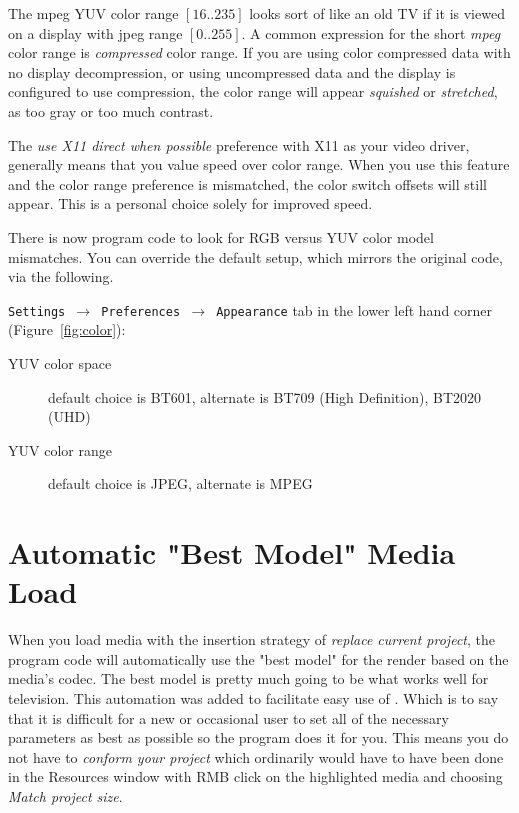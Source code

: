 The mpeg YUV color range $[16..235]$ looks sort of like an old TV if it is viewed on a display with jpeg range $[0..255]$.  A common expression for the short \textit{mpeg} color range is \textit{compressed} color range.  If you are using color compressed data with no display decompression, or using uncompressed data and the display is configured to use compression, the color range will appear \textit{squished} or \textit{stretched}, as too gray or too much contrast.

The \textit{use X11 direct when possible} preference with X11 as your video driver, generally means that you value speed over color range.  When you use this feature and the color range preference is mismatched, the color switch offsets will still appear.  This is a personal choice solely for improved speed.

There is now program code to look for RGB versus YUV color model mismatches.  You can override the default setup, which mirrors the original code, via the following.

\texttt{Settings $\rightarrow$ Preferences $\rightarrow$ Appearance} tab in the lower left hand corner (Figure~\ref{fig:color}):

\begin{description}
    \item[YUV color space] default choice is BT601, alternate is BT709 (High Definition), BT2020 (UHD)
    \item[YUV color range] default choice is JPEG,   alternate is MPEG
\end{description}

\section{Automatic "Best Model" Media Load}%
\label{sec:conform_the_project}
When you load media with the insertion strategy of \textit{replace current project}, the program code will
automatically use the "best model" for the render based on the media's codec.  The best model is pretty
much going to be what works well for television.  This automation was added to facilitate easy use of
\CGG{}.  Which is to say that it is difficult for a new or occasional user to set all of the 
necessary parameters as best as possible so the program does it for you.  This means you do not have to 
\textit{conform your project} which ordinarily would have to have been done in the Resources window with RMB
click on the highlighted media and choosing \textit{Match project size}. 

